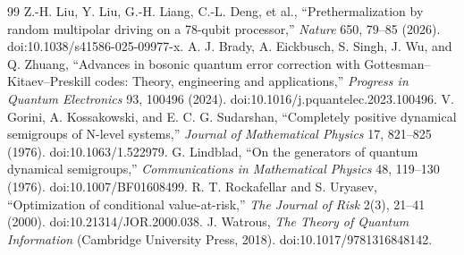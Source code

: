 \documentclass[10pt,twoside]{article}
\begin{document}
\begin{thebibliography}{99}
 Z.-H. Liu, Y. Liu, G.-H. Liang, C.-L. Deng, et al., ``Prethermalization by random multipolar driving on a 78-qubit processor,'' \emph{Nature} 650, 79--85 (2026). doi:10.1038/s41586-025-09977-x.
 A. J. Brady, A. Eickbusch, S. Singh, J. Wu, and Q. Zhuang, ``Advances in bosonic quantum error correction with Gottesman--Kitaev--Preskill codes: Theory, engineering and applications,'' \emph{Progress in Quantum Electronics} 93, 100496 (2024). doi:10.1016/j.pquantelec.2023.100496.
 V. Gorini, A. Kossakowski, and E. C. G. Sudarshan, ``Completely positive dynamical semigroups of N-level systems,'' \emph{Journal of Mathematical Physics} 17, 821--825 (1976). doi:10.1063/1.522979.
 G. Lindblad, ``On the generators of quantum dynamical semigroups,'' \emph{Communications in Mathematical Physics} 48, 119--130 (1976). doi:10.1007/BF01608499.
 R. T. Rockafellar and S. Uryasev, ``Optimization of conditional value-at-risk,'' \emph{The Journal of Risk} 2(3), 21--41 (2000). doi:10.21314/JOR.2000.038.
 J. Watrous, \emph{The Theory of Quantum Information} (Cambridge University Press, 2018). doi:10.1017/9781316848142.
\end{thebibliography}
\end{document}
